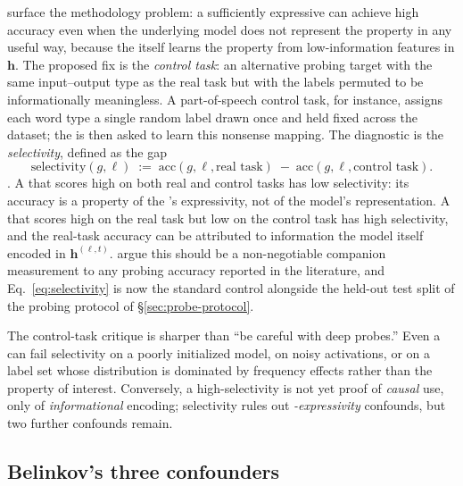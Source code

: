 \citet{hewitt2019-control-tasks} surface the methodology
problem: a sufficiently expressive  can achieve high accuracy
even when the underlying model does not represent the property in any
useful way, because the  itself learns the property from
low-information features in $\mathbf{h}$. The proposed fix is the
\emph{control task}: an alternative probing target with the same
input--output type as the real task but with the labels permuted to be
informationally meaningless. A part-of-speech control task, for
instance, assigns each word type a single random label drawn once and
held fixed across the dataset; the  is then asked to learn this
nonsense mapping. The diagnostic is the \emph{selectivity}, defined
as the gap
\begin{equation}
  \mathrm{selectivity}(g, \ell)
  \;:=\; \mathrm{acc}(g, \ell, \text{real task})
  \;-\; \mathrm{acc}(g, \ell, \text{control task}).
  \label{eq:selectivity}
\end{equation}
\citep{hewitt2019-control-tasks}. A  that scores high on both
real and control tasks has low selectivity: its accuracy is a property
of the 's expressivity, not of the model's representation. A
 that scores high on the real task but low on the control task
has high selectivity, and the real-task accuracy can be attributed to
information the model itself encoded in $\mathbf{h}^{(\ell, t)}$.
\citet{hewitt2019-control-tasks} argue this should be a non-negotiable
companion measurement to any probing accuracy reported in the
literature, and Eq.~\eqref{eq:selectivity} is now the standard
control alongside the held-out test split of the probing protocol of
\S\ref{sec:probe-protocol}.

The control-task critique is sharper than ``be careful with deep
probes.'' Even a  can fail selectivity on a poorly
initialized model, on noisy activations, or on a label set whose
distribution is dominated by frequency effects rather than the
property of interest. Conversely, a high-selectivity  is not yet
proof of \emph{causal} use, only of \emph{informational} encoding;
selectivity rules out \emph{-expressivity} confounds, but two
further confounds remain.

\subsection{Belinkov's three confounders}
\label{sec:belinkov-taxonomy}

